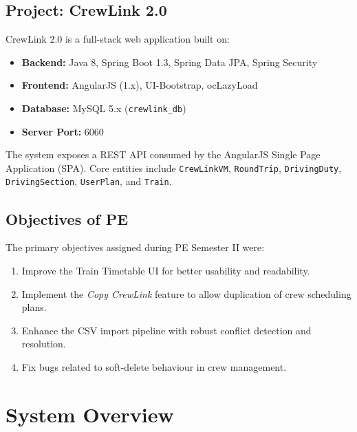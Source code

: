 \documentclass[12pt,a4paper]{article}
\begin{document}
\subsection{Project: CrewLink 2.0}

CrewLink 2.0 is a full-stack web application built on:
\begin{itemize}[leftmargin=1.5em]
    \item \textbf{Backend:} Java 8, Spring Boot 1.3, Spring Data JPA, Spring Security
    \item \textbf{Frontend:} AngularJS (1.x), UI-Bootstrap, ocLazyLoad
    \item \textbf{Database:} MySQL 5.x (\texttt{crewlink\_db})
    \item \textbf{Server Port:} 6060
\end{itemize}

The system exposes a REST API consumed by the AngularJS Single Page Application
(SPA). Core entities include \texttt{CrewLinkVM}, \texttt{RoundTrip},
\texttt{DrivingDuty}, \texttt{DrivingSection}, \texttt{UserPlan}, and
\texttt{Train}.

\subsection{Objectives of PE}

The primary objectives assigned during PE Semester II were:
\begin{enumerate}[leftmargin=1.5em]
    \item Improve the Train Timetable UI for better usability and readability.
    \item Implement the \textit{Copy CrewLink} feature to allow duplication of
          crew scheduling plans.
    \item Enhance the CSV import pipeline with robust conflict detection and
          resolution.
    \item Fix bugs related to soft-delete behaviour in crew management.
\end{enumerate}

\section{System Overview}
\end{document}
